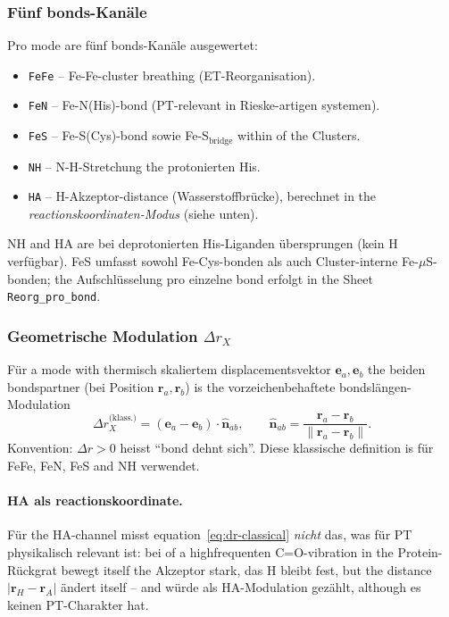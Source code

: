 \documentclass[11pt,a4paper,twoside]{article}
\theoremstyle{remark}
\begin{document}
\subsubsection*{F\"unf bonds-Kan\"ale}

Pro mode are f\"unf bonds-Kan\"ale ausgewertet:

\begin{itemize}\setlength{\itemsep}{0pt}
  \item \texttt{FeFe} -- Fe-Fe-cluster breathing (ET-Reorganisation).
  \item \texttt{FeN} -- Fe-N(His)-bond (PT-relevant in
        Rieske-artigen systemen).
  \item \texttt{FeS} -- Fe-S(Cys)-bond sowie Fe-S$_\text{bridge}$
        within of the Clusters.
  \item \texttt{NH} -- N-H-Stretchung the protonierten His.
  \item \texttt{HA} -- H-Akzeptor-distance (Wasserstoffbr\"ucke), berechnet
        in the \emph{reactionskoordinaten-Modus} (siehe unten).
\end{itemize}

NH and HA are bei deprotonierten His-Liganden \"ubersprungen
(kein H verf\"ugbar). FeS umfasst sowohl Fe-Cys-bonden als auch
Cluster-interne Fe-$\mu$S-bonden; the Aufschl\"usselung pro einzelne
bond erfolgt in the Sheet \texttt{Reorg\_pro\_bond}.

\subsubsection*{Geometrische Modulation $\Delta r_X$}

F\"ur a mode with thermisch skaliertem displacementsvektor
$\mathbf{e}_a, \mathbf{e}_b$ the beiden bondspartner (bei
Position $\mathbf{r}_a, \mathbf{r}_b$) is the vorzeichenbehaftete
bondsl\"angen-Modulation
\begin{equation}
  \Delta r_X^\text{(klass.)}
  = (\mathbf{e}_a - \mathbf{e}_b) \cdot \hat{\mathbf{n}}_{ab},
  \qquad
  \hat{\mathbf{n}}_{ab} = \frac{\mathbf{r}_a - \mathbf{r}_b}{\|\mathbf{r}_a - \mathbf{r}_b\|}.
  \label{eq:dr-classical}
\end{equation}
Konvention: $\Delta r > 0$ heisst "`bond dehnt sich"'.
Diese klassische definition is f\"ur FeFe, FeN, FeS and NH verwendet.

\paragraph{HA als reactionskoordinate.}
F\"ur the HA-channel misst equation~\ref{eq:dr-classical} \emph{nicht}
das, was f\"ur PT physikalisch relevant ist: bei of a highfrequenten
C=O-vibration in the Protein-R\"uckgrat bewegt itself the Akzeptor stark,
das H bleibt fest, but the distance $|\mathbf{r}_H - \mathbf{r}_A|$
\"andert itself -- and w\"urde als HA-Modulation gez\"ahlt, although es
keinen PT-Charakter hat.
\end{document}
